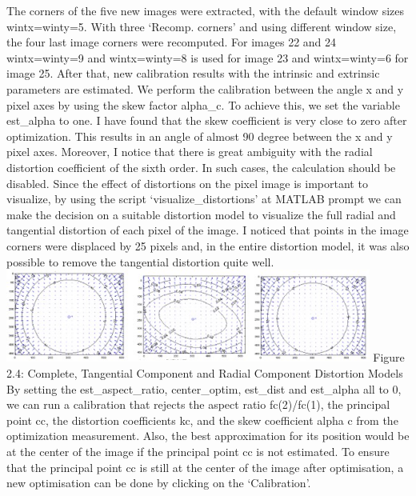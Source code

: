 \documentclass[a4paper, 12pt]{report}
\begin{document}
The corners of the five new images were extracted, with the default window sizes wintx=winty=5. \newline 
With three ‘Recomp. corners’ and using different window size, the four last image corners were recomputed. For images 22 and 24 wintx=winty=9 and wintx=winty=8 is used for image 23 and wintx=winty=6 for image 25. After that, new calibration results with the intrinsic and extrinsic parameters are estimated.
We perform the calibration between the angle x and y pixel axes by using the skew factor alpha\_c. To achieve this, we set the variable est\_alpha to one. \newline
I have found that the skew coefficient is very close to zero after optimization. This results in an angle of almost 90 degree between the x and y pixel axes.   Moreover, I notice that there is great ambiguity with the radial distortion coefficient of the sixth order. In such cases, the calculation should be disabled. \newline 
Since the effect of distortions on the pixel image is important to visualize, by using the script ‘visualize\_distortions’ at MATLAB prompt we can make the decision on a suitable distortion model to visualize the full radial and tangential distortion of each pixel of the image. I noticed that points in the image corners were displaced by 25 pixels and, in the entire distortion model, it was also possible to remove the tangential distortion quite well.
\newline 
\includegraphics[width=0.9\textwidth]{resources/image/15.jpg} \newline
Figure 2.4: Complete, Tangential Component and Radial Component Distortion Models \newline \newline 
By setting the est\_aspect\_ratio, center\_optim, est\_dist and est\_alpha  all to 0, we can run a calibration that rejects the aspect ratio fc(2)/fc(1), the principal point cc, the distortion coefficients kc, and the skew coefficient alpha c from the optimization measurement. Also, the best approximation for its position would be at the center of the image if the principal point cc is not estimated. To ensure that the principal point cc is still at the center of the image after optimisation, a new optimisation can be done by clicking on the ‘Calibration’. \newline 
\end{document}
